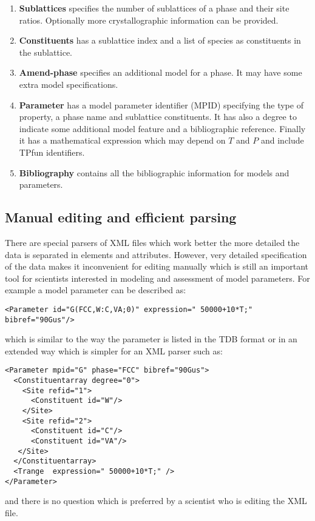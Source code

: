 \documentclass[12pt]{article}
\begin{document}
\begin{enumerate}
\item {\bf Sublattices} specifies the number of sublattices of a phase
  and their site ratios.  Optionally more crystallographic information
  can be provided.
  
\item {\bf Constituents} has a sublattice index and a list of species
  as constituents in the sublattice.
  
\item {\bf Amend-phase} specifies an additional model for a phase.  It
  may have some extra model specifications.
  
\item {\bf Parameter} has a model parameter identifier (MPID)
  specifying the type of property, a phase name and sublattice
  constituents.  It has also a degree to indicate some additional
  model feature and a bibliographic reference.  Finally it has a
  mathematical expression which may depend on $T$ and $P$ and include
  TPfun identifiers.

\item {\bf Bibliography} contains all the bibliographic information
  for models and parameters.
\end{enumerate}

\subsection{Manual editing and efficient parsing}\label{sc:manualedit}

There are special parsers of XML files which work better the more
detailed the data is separated in elements and attributes.  However,
very detailed specification of the data makes it inconvenient for
editing manually which is still an important tool for scientists
interested in modeling and assessment of model parameters.  For
example a model parameter can be described as:

\begin{verbatim}
<Parameter id="G(FCC,W:C,VA;0)" expression=" 50000+10*T;" bibref="90Gus"/>
\end{verbatim}
which is similar to the way the parameter is listed in the TDB format
or in an extended way which is simpler for an XML parser such as:

\begin{verbatim}
<Parameter mpid="G" phase="FCC" bibref="90Gus">
  <Constituentarray degree="0">
    <Site refid="1">
      <Constituent id="W"/>
    </Site>
    <Site refid="2">
      <Constituent id="C"/>
      <Constituent id="VA"/>
   </Site>
  </Constituentarray>
  <Trange  expression=" 50000+10*T;" />
</Parameter>
\end{verbatim}
and there is no question which is preferred by a scientist who is
editing the XML file.
\end{document}
